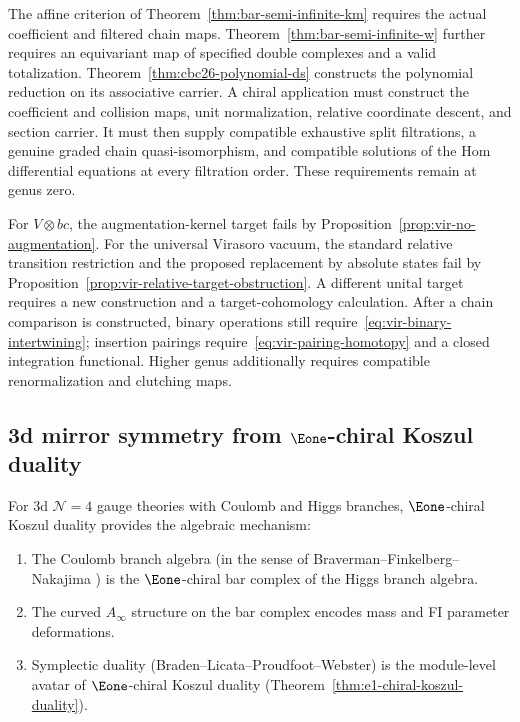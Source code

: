 \begin{remark}\label{rem:brst-chain-map-pieces}
The affine criterion of Theorem~\ref{thm:bar-semi-infinite-km} requires the actual coefficient and filtered chain maps.
Theorem~\ref{thm:bar-semi-infinite-w} further requires an equivariant map of specified double complexes and a valid totalization.
Theorem~\ref{thm:cbc26-polynomial-ds} constructs the polynomial reduction on its associative carrier.
A chiral application must construct the coefficient and collision maps, unit normalization, relative coordinate descent, and section carrier.
It must then supply compatible exhaustive split filtrations, a genuine graded chain quasi-isomorphism, and compatible solutions of the Hom differential equations at every filtration order.
These requirements remain at genus zero.

For $V\otimes bc$, the augmentation-kernel target fails by Proposition~\ref{prop:vir-no-augmentation}.
For the universal Virasoro vacuum, the standard relative transition restriction and the proposed replacement by absolute states fail by Proposition~\ref{prop:vir-relative-target-obstruction}.
A different unital target requires a new construction and a target-cohomology calculation.
After a chain comparison is constructed, binary operations still require~\eqref{eq:vir-binary-intertwining}; insertion pairings require~\eqref{eq:vir-pairing-homotopy} and a closed integration functional.
Higher genus additionally requires compatible renormalization and clutching maps.
\end{remark}

\subsection{\texorpdfstring{3d mirror symmetry from $\Eone$-chiral Koszul duality}{3d mirror symmetry from E1-chiral Koszul duality}}
\label{subsec:3d-mirror}

\begin{conjecture}\label{conj:3d-mirror}
For 3d $\mathcal{N}=4$ gauge theories with Coulomb and Higgs
branches, $\Eone$-chiral Koszul duality provides the algebraic
mechanism:
\begin{enumerate}[label=\textup{(\roman*)}]
\item The Coulomb branch algebra \textup{(}in the sense of
  Braverman--Finkelberg--Nakajima \cite{BFN18}\textup{)}
  is the $\Eone$-chiral bar complex of the Higgs branch algebra.
\item The curved $A_\infty$ structure on the bar complex
  encodes mass and FI parameter deformations.
\item Symplectic duality \textup{(}Braden--Licata--Proudfoot--Webster\textup{)}
  is the module-level avatar of $\Eone$-chiral Koszul duality
  \textup{(}Theorem~\textup{\ref{thm:e1-chiral-koszul-duality})}.
\end{enumerate}
\end{conjecture}

